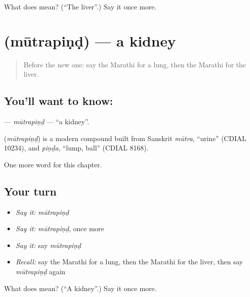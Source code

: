 \begin{tcolorbox}[breakable,colback=teal!4,colframe=teal!35!black,title={Before you move on}]
What does  mean? (\textquotedblleft{}The liver\textquotedblright{}.) Say it once more.
\end{tcolorbox}
\section[\texorpdfstring{\mr{मूत्रपिंड} (mūtrapiṇḍ)}{मूत्रपिंड (mūtrapiṇḍ)}]{ (mūtrapiṇḍ) — a kidney}

\label{lesson:MR-C169-mutrapind}



\begin{quote}
Before the new one: say the Marathi for a lung, then the Marathi for the liver.
\end{quote}

\subsection*{You'll want to know: }
\textbf{} — \emph{mūtrapiṇḍ} — \textquotedblleft{}a kidney\textquotedblright{}.

\begin{cousinweb}
\textbf{} (\emph{mūtrapiṇḍ}) is a modern compound built from Sanskrit \emph{mūtra}, \textquotedblleft{}urine\textquotedblright{} (CDIAL 10234), and \emph{piṇḍa}, \textquotedblleft{}lump, ball\textquotedblright{} (CDIAL 8168).
\end{cousinweb}

\begin{grammarlens}[title={What you've built}]
One more word for this chapter.
\end{grammarlens}

\subsection*{Your turn}
\begin{itemize}
\raggedright
  \item \emph{Say it:} \emph{mūtrapiṇḍ}
  \item \emph{Say it:} \emph{mūtrapiṇḍ}, once more
  \item \emph{Say it:} say \emph{mūtrapiṇḍ}
  \item \emph{Recall:} say the Marathi for a lung, then the Marathi for the liver, then say \emph{mūtrapiṇḍ} again
\end{itemize}

\begin{tcolorbox}[breakable,colback=teal!4,colframe=teal!35!black,title={Before you move on}]
What does  mean? (\textquotedblleft{}A kidney\textquotedblright{}.) Say it once more.
\end{tcolorbox}
